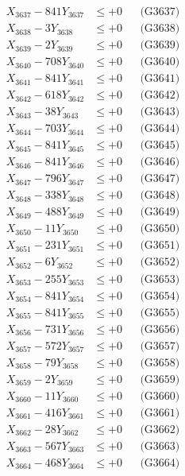 \documentclass[a4paper,10pt]{article}
\begin{document}
{\begin{align}
X_{3637} - 841Y_{3637} &\leq +0 && \text{(G3637)} \\
X_{3638} - 3Y_{3638} &\leq +0 && \text{(G3638)} \\
X_{3639} - 2Y_{3639} &\leq +0 && \text{(G3639)} \\
X_{3640} - 708Y_{3640} &\leq +0 && \text{(G3640)} \\
\allowbreak
X_{3641} - 841Y_{3641} &\leq +0 && \text{(G3641)} \\
X_{3642} - 618Y_{3642} &\leq +0 && \text{(G3642)} \\
X_{3643} - 38Y_{3643} &\leq +0 && \text{(G3643)} \\
X_{3644} - 703Y_{3644} &\leq +0 && \text{(G3644)} \\
X_{3645} - 841Y_{3645} &\leq +0 && \text{(G3645)} \\
X_{3646} - 841Y_{3646} &\leq +0 && \text{(G3646)} \\
X_{3647} - 796Y_{3647} &\leq +0 && \text{(G3647)} \\
X_{3648} - 338Y_{3648} &\leq +0 && \text{(G3648)} \\
X_{3649} - 488Y_{3649} &\leq +0 && \text{(G3649)} \\
X_{3650} - 11Y_{3650} &\leq +0 && \text{(G3650)} \\
\allowbreak
X_{3651} - 231Y_{3651} &\leq +0 && \text{(G3651)} \\
X_{3652} - 6Y_{3652} &\leq +0 && \text{(G3652)} \\
X_{3653} - 255Y_{3653} &\leq +0 && \text{(G3653)} \\
X_{3654} - 841Y_{3654} &\leq +0 && \text{(G3654)} \\
X_{3655} - 841Y_{3655} &\leq +0 && \text{(G3655)} \\
X_{3656} - 731Y_{3656} &\leq +0 && \text{(G3656)} \\
X_{3657} - 572Y_{3657} &\leq +0 && \text{(G3657)} \\
X_{3658} - 79Y_{3658} &\leq +0 && \text{(G3658)} \\
X_{3659} - 2Y_{3659} &\leq +0 && \text{(G3659)} \\
X_{3660} - 11Y_{3660} &\leq +0 && \text{(G3660)} \\
\allowbreak
X_{3661} - 416Y_{3661} &\leq +0 && \text{(G3661)} \\
X_{3662} - 28Y_{3662} &\leq +0 && \text{(G3662)} \\
X_{3663} - 567Y_{3663} &\leq +0 && \text{(G3663)} \\
X_{3664} - 468Y_{3664} &\leq +0 && \text{(G3664)} \\

\end{align}}
\end{document}
